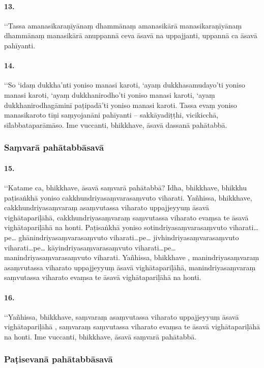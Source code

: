 \paragraph{13.} ‘‘Tassa amanasikaraṇīyānaṃ dhammānaṃ amanasikārā manasikaraṇīyānaṃ dhammānaṃ manasikārā anuppannā ceva āsavā na uppajjanti, uppannā ca āsavā pahīyanti.

\paragraph{14.} ‘‘So ‘idaṃ dukkha’nti yoniso manasi karoti, ‘ayaṃ dukkhasamudayo’ti yoniso manasi karoti, ‘ayaṃ dukkhanirodho’ti yoniso manasi karoti, ‘ayaṃ dukkhanirodhagāminī paṭipadā’ti yoniso manasi karoti. Tassa evaṃ yoniso manasikaroto tīṇi saṃyojanāni pahīyanti – sakkāyadiṭṭhi, vicikicchā, sīlabbataparāmāso. Ime vuccanti, bhikkhave, āsavā dassanā pahātabbā.

\subsubsection{Saṃvarā pahātabbāsavā}

\paragraph{15.} ‘‘Katame ca, bhikkhave, āsavā saṃvarā pahātabbā? Idha, bhikkhave, bhikkhu paṭisaṅkhā yoniso cakkhundriyasaṃvarasaṃvuto viharati. Yañhissa, bhikkhave, cakkhundriyasaṃvaraṃ asaṃvutassa viharato uppajjeyyuṃ āsavā vighātapariḷāhā, cakkhundriyasaṃvaraṃ saṃvutassa viharato evaṃsa te āsavā vighātapariḷāhā na honti. Paṭisaṅkhā yoniso sotindriyasaṃvarasaṃvuto viharati…pe… ghānindriyasaṃvarasaṃvuto viharati…pe… jivhindriyasaṃvarasaṃvuto viharati…pe… kāyindriyasaṃvarasaṃvuto viharati…pe… manindriyasaṃvarasaṃvuto viharati. Yañhissa, bhikkhave , manindriyasaṃvaraṃ asaṃvutassa viharato uppajjeyyuṃ āsavā vighātapariḷāhā, manindriyasaṃvaraṃ saṃvutassa viharato evaṃsa te āsavā vighātapariḷāhā na honti.

\paragraph{16.} ‘‘Yañhissa, bhikkhave, saṃvaraṃ asaṃvutassa viharato uppajjeyyuṃ āsavā vighātapariḷāhā , saṃvaraṃ saṃvutassa viharato evaṃsa te āsavā vighātapariḷāhā na honti. Ime vuccanti, bhikkhave, āsavā saṃvarā pahātabbā.

\subsubsection{Paṭisevanā pahātabbāsavā}

